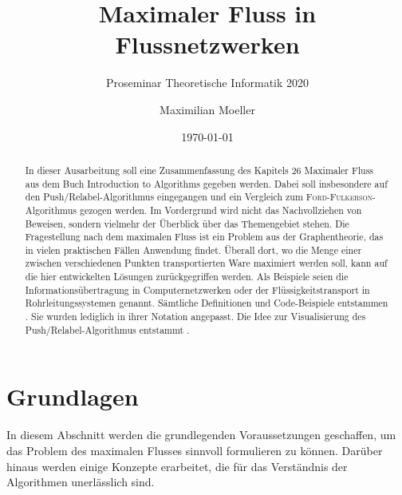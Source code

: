 \documentclass[12pt,a4paper,titlepage,onecolumn,ngerman,bibliography=totocnumbered]{scrartcl}
\theoremstyle{definition}
\theoremstyle{remark}
\newcommand{\ff}{\textsc{Ford-Fulkerson}}
\newcommand{\pr}{Push/Relabel}
\begin{document}
\author{Maximilian Moeller}
\title{Maximaler Fluss in Flussnetzwerken}
\subtitle{Proseminar Theoretische Informatik 2020}
\date{\today}

\maketitle

\tableofcontents

\begin{abstract}
	In dieser Ausarbeitung soll eine Zusammenfassung des Kapitels 26 \glqq Maximaler Fluss\grqq{} aus dem Buch \glqq Introduction to Algorithms\grqq{} \parencite{Cormen09} gegeben werden.
	Dabei soll insbesondere auf den \pr -Algorithmus eingegangen und ein Vergleich zum \ff -Algorithmus gezogen werden.
	Im Vordergrund wird nicht das Nachvollziehen von Beweisen, sondern vielmehr der Überblick über das Themengebiet stehen.
	\medbreak
	Die Fragestellung nach dem maximalen Fluss ist ein Problem aus der Graphentheorie, das
	in vielen praktischen Fällen Anwendung findet.
	Überall dort, wo die Menge einer zwischen verschiedenen Punkten transportierten Ware maximiert werden soll, kann auf die hier entwickelten Lösungen zurückgegriffen werden.
	Als Beispiele seien die Informationsübertragung in Computernetzwerken oder der Flüssigkeitstransport in Rohrleitungssystemen genannt.
	\medbreak
	Sämtliche Definitionen und Code-Beispiele entstammen \cite{Cormen09}.
	Sie wurden lediglich in ihrer Notation angepasst.
	Die Idee zur Visualisierung des \pr -Algorithmus entstammt \cite{PR-Visual}.
\end{abstract}

\section{Grundlagen}
In diesem Abschnitt werden die grundlegenden Voraussetzungen geschaffen, um das Problem des maximalen Flusses sinnvoll formulieren zu können.
Darüber hinaus werden einige Konzepte erarbeitet, die für das Verständnis der Algorithmen unerlässlich sind.
\end{document}
